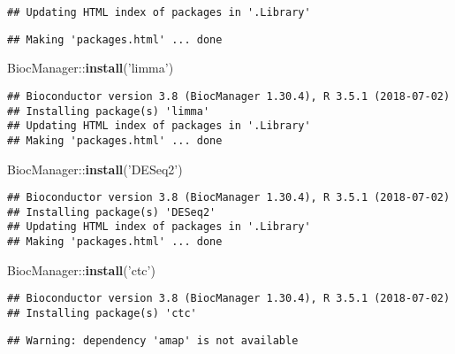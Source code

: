 \documentclass[]{article}
\newenvironment{Shaded}{\begin{snugshade}}{\end{snugshade}}
\newcommand{\KeywordTok}[1]{\textcolor[rgb]{0.13,0.29,0.53}{\textbf{{#1}}}}
\newcommand{\StringTok}[1]{\textcolor[rgb]{0.31,0.60,0.02}{{#1}}}
\newcommand{\NormalTok}[1]{{#1}}
\begin{document}
\begin{verbatim}
## Updating HTML index of packages in '.Library'
\end{verbatim}

\begin{verbatim}
## Making 'packages.html' ... done
\end{verbatim}

\begin{Shaded}
\begin{Highlighting}[]
\NormalTok{BiocManager::}\KeywordTok{install}\NormalTok{(}\StringTok{'limma'}\NormalTok{)}
\end{Highlighting}
\end{Shaded}

\begin{verbatim}
## Bioconductor version 3.8 (BiocManager 1.30.4), R 3.5.1 (2018-07-02)
## Installing package(s) 'limma'
## Updating HTML index of packages in '.Library'
## Making 'packages.html' ... done
\end{verbatim}

\begin{Shaded}
\begin{Highlighting}[]
\NormalTok{BiocManager::}\KeywordTok{install}\NormalTok{(}\StringTok{'DESeq2'}\NormalTok{)}
\end{Highlighting}
\end{Shaded}

\begin{verbatim}
## Bioconductor version 3.8 (BiocManager 1.30.4), R 3.5.1 (2018-07-02)
## Installing package(s) 'DESeq2'
## Updating HTML index of packages in '.Library'
## Making 'packages.html' ... done
\end{verbatim}

\begin{Shaded}
\begin{Highlighting}[]
\NormalTok{BiocManager::}\KeywordTok{install}\NormalTok{(}\StringTok{'ctc'}\NormalTok{)}
\end{Highlighting}
\end{Shaded}

\begin{verbatim}
## Bioconductor version 3.8 (BiocManager 1.30.4), R 3.5.1 (2018-07-02)
## Installing package(s) 'ctc'
\end{verbatim}

\begin{verbatim}
## Warning: dependency 'amap' is not available
\end{verbatim}
\end{document}
